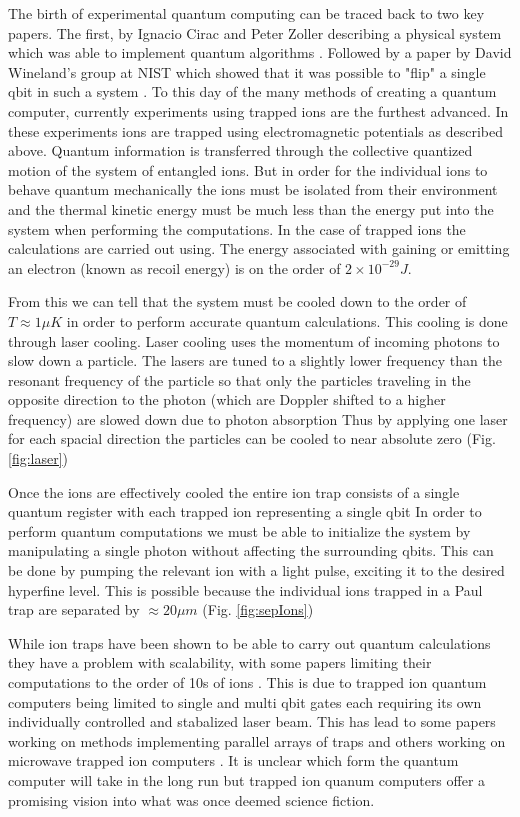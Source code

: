 \documentclass[aps,prb,twocolumn,superscriptaddress]{revtex4-1}
\begin{document}
The birth of experimental quantum computing can be traced back to two key papers. The first, by Ignacio Cirac and Peter Zoller describing a physical system which was able to implement quantum algorithms \citealp{cirac1995quantum}. Followed by a paper by David Wineland's group at NIST which showed that it was possible to "flip" a single qbit in such a system \cite{monroe1995demonstration}. To this day of the many methods of creating a quantum computer, currently experiments using trapped ions are the furthest advanced. In these experiments ions are trapped using electromagnetic potentials as described above. Quantum information is transferred through the collective quantized motion of the system of entangled ions. But in order for the individual ions to behave quantum mechanically the ions must be isolated from their environment and the thermal kinetic energy must be much less than the energy put into the system when performing the computations.  In the case of trapped ions the calculations are carried out using. The energy associated with gaining or emitting an electron (known as recoil energy) is on the order of $2\times 10^{-29}J$.
 
From this we can tell that the system must be cooled down to the order of $T\approx1\mu K$ in order to perform accurate quantum calculations.
This cooling is done through laser cooling. Laser cooling uses the momentum of incoming photons to slow down a particle. The lasers are tuned to a slightly lower frequency than the resonant frequency of the particle so that only the particles traveling in the opposite direction to the photon (which are Doppler shifted to a higher frequency) are slowed down due to photon absorption Thus by applying one laser for each spacial direction the particles can be cooled to near absolute zero (Fig. \ref{fig:laser})

Once the ions are effectively cooled the entire ion trap consists of a single quantum register with each trapped ion representing a single qbit In order to perform quantum computations we must be able to initialize the system by manipulating a single photon without affecting the surrounding qbits. This can be done by pumping the relevant ion with a light pulse, exciting it to the desired hyperfine level. This is possible because the individual ions trapped in a Paul trap are separated by $\approx20\mu m$ (Fig.  \ref{fig:sepIons})

While ion traps have been shown to be able to carry out quantum calculations they have a problem with scalability, with some papers limiting their computations to the order of 10s of ions \cite{wineland1998experimental,bartlett2001experimental}. This is due to trapped ion quantum computers being limited to single and multi qbit gates each requiring its own individually controlled and stabalized laser beam. This has lead to some papers working on methods implementing parallel arrays of traps\cite{kielpinski2002architecture} and others working on microwave trapped ion computers \cite{lekitsch2017blueprint}. It is unclear which form the quantum computer will take in the long run but trapped ion quanum computers offer a promising vision into what was once deemed science fiction.
\end{document}
